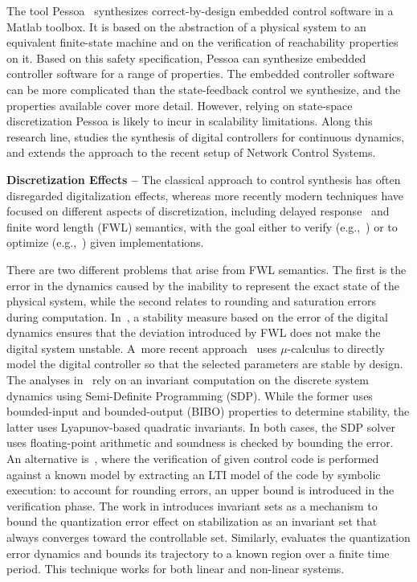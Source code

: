 \documentclass[sigconf]{llncs}
\begin{document}
The tool Pessoa~\cite{mazo2010pessoa} synthesizes correct-by-design embedded
control software in a Matlab toolbox.  It is based on the abstraction of a
physical system to an equivalent finite-state machine and on the
verification of reachability properties on it.  Based on this safety
specification, \mbox{Pessoa} can synthesize embedded controller software for
a range of properties.  The embedded controller software can be more
complicated than the state-feedback control we synthesize, and the
properties available cover more detail.  However, relying on state-space
discretization \mbox{Pessoa} is likely to incur in scalability limitations. 
Along this research line, \cite{Anta2010,liu16} studies the synthesis of
digital controllers for continuous dynamics, and \cite{zamani2014} extends
the approach to the recent setup of Network Control Systems.

\textbf{Discretization Effects --}
The classical approach to control synthesis has often disregarded
digitalization effects, whereas more recently modern techniques have focused
on different aspects of discretization, including delayed
response~\cite{Duggirala2015} and finite word length (FWL) semantics, with
the goal either to verify (e.g.,~\cite{daes20161}) or to optimize
(e.g.,~\cite{oudjida2014design}) given implementations.

There are two different problems that arise from FWL semantics.  The first
is the error in the dynamics caused by the inability to represent the exact
state of the physical system, while the second relates to rounding and
saturation errors during computation.  In~\cite{fialho1994stability}, a
stability measure based on the error of the digital dynamics ensures that
the deviation introduced by FWL does not make the digital system unstable. 
A~more recent approach~\cite{DBLP:journals/automatica/WuLCC09} uses
$\mu$-calculus to directly model the digital controller so that the selected
parameters are stable by design.  The analyses
in~\cite{DBLP:conf/hybrid/RouxJG15,DBLP:conf/hybrid/WangGRJF16} rely on an
invariant computation on the discrete system dynamics using Semi-Definite
Programming (SDP).  While the former uses bounded-input and bounded-output
(BIBO) properties to determine stability, the latter uses Lyapunov-based
quadratic invariants.  In both cases, the SDP solver uses floating-point
arithmetic and soundness is checked by bounding the error.  An alternative
is~\cite{park2016scalable}, where the verification of given control code is
performed against a known model by extracting an LTI model of the code by
symbolic execution: to account for rounding errors, an upper bound is
introduced in the verification phase.  The work in
\cite{picasso2003stabilization} introduces invariant sets as a mechanism to
bound the quantization error effect on stabilization as an invariant set
that always converges toward the controllable set.  Similarly,
\cite{liberzon2003hybrid} evaluates the quantization error dynamics and
bounds its trajectory to a known region over a finite time period.  This
technique works for both linear and non-linear systems.
\end{document}
